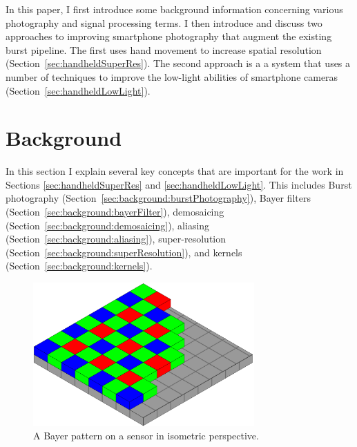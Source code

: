 \documentclass{sig-alternate}
\begin{document}
In this paper, I first introduce some background information concerning various photography and signal processing terms. I then introduce and discuss two approaches to improving smartphone photography that augment the existing burst pipeline. The first uses hand movement to increase spatial resolution (Section~\ref{sec:handheldSuperRes}). The second approach is a a system that uses a number of techniques to improve the low-light abilities of smartphone cameras (Section~\ref{sec:handheldLowLight}).

\section{Background}
\label{sec:background}

In this section I explain several key concepts that are important for the work in Sections \ref{sec:handheldSuperRes} and \ref{sec:handheldLowLight}. This includes Burst photography (Section~\ref{sec:background:burstPhotography}), Bayer filters (Section~\ref{sec:background:bayerFilter}), demosaicing (Section~\ref{sec:background:demosaicing}), aliasing (Section~\ref{sec:background:aliasing}), super-resolution (Section~\ref{sec:background:superResolution}), and kernels (Section~\ref{sec:background:kernels}).

\begin{figure}
\centering
\includegraphics[width=20pc]{Bayer_pattern_on_sensor}
\caption{A Bayer pattern on a sensor in isometric perspective.~\cite{wiki:BayerFilter}}
\label{fig:BayerPattern}
\end{figure}
\end{document}
